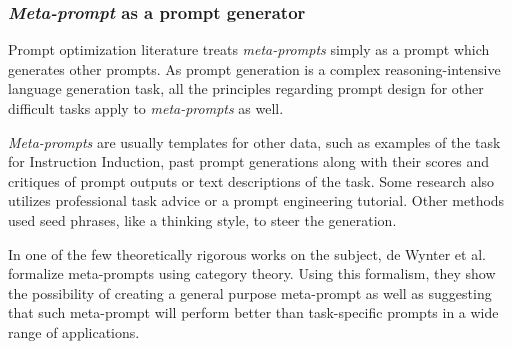 \subsubsection{\textit{Meta-prompt} as a prompt generator}
Prompt optimization literature\cite{ramnath2025systematicsurveyautomaticprompt} treats \textit{meta-prompts} simply as a prompt which generates other prompts.
As prompt generation is a complex reasoning-intensive language generation task\cite{ye2024promptengineeringpromptengineer}, 
all the principles regarding prompt design for other difficult tasks apply to \textit{meta-prompts} as well.

\textit{Meta-prompts} are usually templates for other data, such as examples of the task for Instruction Induction\cite{honovich2022instructioninductionexamplesnatural},
past prompt generations along with their scores\cite{yang2024largelanguagemodelsoptimizers} and critiques of prompt outputs\cite{he2024crispomultiaspectcritiquesuggestionguidedautomatic}
or text descriptions of the task\cite{ye2024promptengineeringpromptengineer}. Some research also utilizes professional task advice\cite{ramnath2025systematicsurveyautomaticprompt}
or a prompt engineering tutorial\cite{ye2024promptengineeringpromptengineer}. Other methods used seed phrases, like a thinking 
style\cite{fernando2023promptbreederselfreferentialselfimprovementprompt}, to steer the generation.

In one of the few theoretically rigorous works on the subject, de Wynter et al.\cite{dewynter2024metaprompting} formalize meta-prompts
using category theory. Using this formalism, they show the possibility of creating a general purpose meta-prompt as well as suggesting that such meta-prompt
will perform better than task-specific prompts in a wide range of applications.
